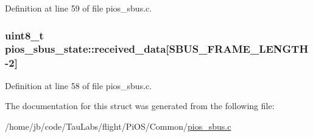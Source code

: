 \-Definition at line 59 of file pios\-\_\-sbus.\-c.

\hypertarget{structpios__sbus__state_a83bb02cd783bb2f8d8aabf3b94e9324b}{
\subsubsection[{received\-\_\-data}]{\setlength{\rightskip}{0pt plus 5cm}uint8\-\_\-t {\bf pios\-\_\-sbus\-\_\-state\-::received\-\_\-data}\mbox{[}\-S\-B\-U\-S\-\_\-\-F\-R\-A\-M\-E\-\_\-\-L\-E\-N\-G\-T\-H-\/2\mbox{]}}}\label{structpios__sbus__state_a83bb02cd783bb2f8d8aabf3b94e9324b}


\-Definition at line 58 of file pios\-\_\-sbus.\-c.



\-The documentation for this struct was generated from the following file\-:\begin{DoxyCompactItemize}
\item 
/home/jb/code/\-Tau\-Labs/flight/\-Pi\-O\-S/\-Common/\hyperlink{pios__sbus_8c}{pios\-\_\-sbus.\-c}\end{DoxyCompactItemize}
